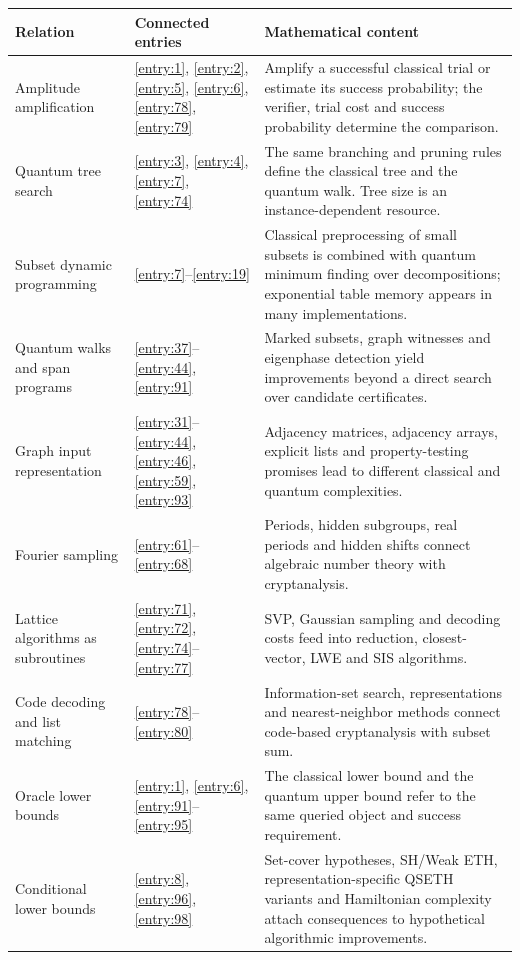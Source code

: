 \documentclass[11pt,a4paper]{article}
\theoremstyle{problemstyle}
\begin{document}
\begin{longtable}{@{}p{}p{}p{}@{}}
\toprule
Relation & Connected entries & Mathematical content \\
\midrule
\endhead
Amplitude amplification & \ref{entry:1}, \ref{entry:2}, \ref{entry:5}, \ref{entry:6}, \ref{entry:78}, \ref{entry:79} & Amplify a successful classical trial or estimate its success probability; the verifier, trial cost and success probability determine the comparison. \\
Quantum tree search & \ref{entry:3}, \ref{entry:4}, \ref{entry:7}, \ref{entry:74} & The same branching and pruning rules define the classical tree and the quantum walk. Tree size is an instance-dependent resource. \\
Subset dynamic programming & \ref{entry:7}--\ref{entry:19} & Classical preprocessing of small subsets is combined with quantum minimum finding over decompositions; exponential table memory appears in many implementations. \\
Quantum walks and span programs & \ref{entry:37}--\ref{entry:44}, \ref{entry:91} & Marked subsets, graph witnesses and eigenphase detection yield improvements beyond a direct search over candidate certificates. \\
Graph input representation & \ref{entry:31}--\ref{entry:44}, \ref{entry:46}, \ref{entry:59}, \ref{entry:93} & Adjacency matrices, adjacency arrays, explicit lists and property-testing promises lead to different classical and quantum complexities. \\
Fourier sampling & \ref{entry:61}--\ref{entry:68} & Periods, hidden subgroups, real periods and hidden shifts connect algebraic number theory with cryptanalysis. \\
Lattice algorithms as subroutines & \ref{entry:71}, \ref{entry:72}, \ref{entry:74}--\ref{entry:77} & SVP, Gaussian sampling and decoding costs feed into reduction, closest-vector, LWE and SIS algorithms. \\
Code decoding and list matching & \ref{entry:78}--\ref{entry:80} & Information-set search, representations and nearest-neighbor methods connect code-based cryptanalysis with subset sum. \\
Oracle lower bounds & \ref{entry:1}, \ref{entry:6}, \ref{entry:91}--\ref{entry:95} & The classical lower bound and the quantum upper bound refer to the same queried object and success requirement. \\
Conditional lower bounds & \ref{entry:8}, \ref{entry:96}, \ref{entry:98} & Set-cover hypotheses, SH/Weak ETH, representation-specific QSETH variants and Hamiltonian complexity attach consequences to hypothetical algorithmic improvements. \\

\end{longtable}
\end{document}
